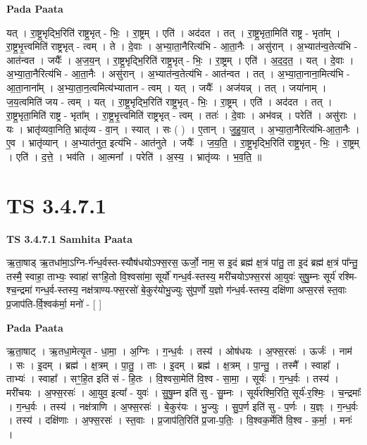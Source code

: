 \documentclass[17pt]{extarticle}
\begin{document}
\textbf{Pada Paata} \newline

यत् । रा॒ष्ट्र॒भृद्भि॒रिति॑ राष्ट्र॒भृत् - भिः॒ । रा॒ष्ट्रम् । एति॑ । अद॑दत । तत् । रा॒ष्ट्र॒भृता॒मिति॑ राष्ट्र - भृता᳚म् । रा॒ष्ट्र॒भृ॒त्त्वमिति॑ राष्ट्रभृत् - त्वम् । ते । दे॒वाः । अ॒भ्या॒ता॒नैरित्य॑भि - आ॒ता॒नैः । असु॑रान् । अ॒भ्यात॑न्व॒तेत्य॑भि - आत॑न्वत । जयैः᳚ । अ॒ज॒य॒न् । रा॒ष्ट्र॒भृद्भि॒रिति॑ राष्ट्र॒भृत् - भिः॒ । रा॒ष्ट्रम् । एति॑ । अ॒द॒द॒त॒ । यत् । दे॒वाः । अ॒भ्या॒ता॒नैरित्य॑भि - आ॒ता॒नैः । असु॑रान् । अ॒भ्यात॑न्व॒तेत्य॑भि - आत॑न्वत । तत् । अ॒भ्या॒ता॒नाना॒मित्य॑भि - आ॒ता॒नाना᳚म् । अ॒भ्या॒ता॒न॒त्वमित्य॑भ्यातान - त्वम् । यत् । जयैः᳚ । अज॑यन्न् । तत् । जया॑नाम् । ज॒य॒त्वमिति॑ जय - त्वम् । यत् । रा॒ष्ट्र॒भृद्भि॒रिति॑ राष्ट्र॒भृत् - भिः॒ । रा॒ष्ट्रम् । एति॑ । अद॑दत । तत् । रा॒ष्ट्र॒भृता॒मिति॑ राष्ट्र - भृता᳚म् । रा॒ष्ट्र॒भृ॒त्त्वमिति॑ राष्ट्रभृत् - त्वम् । ततः॑ । दे॒वाः । अभ॑वन्न् । परेति॑ । असु॑राः । यः । भ्रातृ॑व्यवा॒निति॒ भ्रातृ॑व्य - वा॒न् । स्यात् । सः ( ) । ए॒तान् । जु॒हु॒या॒त् । अ॒भ्या॒ता॒नैरित्य॑भि-आ॒ता॒नैः । ए॒व । भ्रातृ॑व्यान् । अ॒भ्यात॑नुत॒ इत्य॑भि - आत॑नुते । जयैः᳚ । ज॒य॒ति॒ । रा॒ष्ट्र॒भृद्भि॒रिति॑ राष्ट्र॒भृत् - भिः॒ । रा॒ष्ट्रम् । एति॑ । द॒त्ते॒ । भव॑ति । आ॒त्मना᳚ । परेति॑ । अ॒स्य॒ । भ्रातृ॑व्यः । भ॒व॒ति॒ ॥  \newline





\section{ TS 3.4.7.1 }

\textbf{TS 3.4.7.1 } \newline
\textbf{Samhita Paata} \newline

ऋ॒ता॒षाड् ऋ॒तधा॑मा॒ऽग्नि-र्ग॑न्ध॒र्वस्त-स्यौष॑धयोऽफ्स॒रस॒ ऊर्जो॒ नाम॒ स इ॒दं ब्रह्म॑ क्ष॒त्रं पा॑तु॒ ता इ॒दं ब्रह्म॑ क्ष॒त्रं पा᳚न्तु॒ तस्मै॒ स्वाहा॒ ताभ्यः॒ स्वाहा॑ सꣳहि॒तो वि॒श्वसा॑मा॒ सूर्यो॑ गन्ध॒र्व-स्तस्य॒ मरी॑चयोऽफ्स॒रस॑ आ॒युवः॑ सुषु॒म्नः सूर्य॑ रश्मि-श्च॒न्द्रमा॑ गन्ध॒र्व-स्तस्य॒ नक्ष॑त्राण्य-फ्स॒रसो॑ बे॒कुर॑योभु॒ज्युः सु॑प॒र्णो य॒ज्ञो ग॑न्ध॒र्व-स्तस्य॒ दक्षि॑णा अप्स॒रस॑ स्त॒वाः प्र॒जाप॑ति-र्वि॒श्वक॑र्मा॒ मनो॑ - [  ] \newline

\textbf{Pada Paata} \newline

ऋ॒ता॒षाट् । ऋ॒तधा॒मेत्यृ॒त - धा॒मा॒ । अ॒ग्निः । ग॒न्ध॒र्वः । तस्य॑ । ओष॑धयः । अ॒फ्स॒रसः॑ । ऊर्जः॑ । नाम॑ । सः । इ॒दम् । ब्रह्म॑ । क्ष॒त्रम् । पा॒तु॒ । ताः । इ॒दम् । ब्रह्म॑ । क्ष॒त्रम् । पा॒न्तु॒ । तस्मै᳚ । स्वाहा᳚ । ताभ्यः॑ । स्वाहा᳚ । सꣳ॒॒हि॒त इति॑ सं - हि॒तः । वि॒श्वसा॒मेति॑ वि॒श्व - सा॒मा॒ । सूर्यः॑ । ग॒न्ध॒र्वः । तस्य॑ । मरी॑चयः । अ॒फ्स॒रसः॑ । आ॒युव॒ इत्या᳚ - युवः॑ । सु॒षु॒म्न इति॑ सु - सु॒म्नः । सूर्य॑रश्मि॒रिति॒ सूर्य॑-र॒श्मिः॒ । च॒न्द्रमाः᳚ । ग॒न्ध॒र्वः । तस्य॑ । नक्ष॑त्राणि । अ॒फ्स॒रसः॑ । बे॒कुर॑यः । भु॒ज्युः । सु॒प॒र्ण इति॑ सु - प॒र्णः । य॒ज्ञ्ः । ग॒न्ध॒र्वः । तस्य॑ । दक्षि॑णाः । अ॒फ्स॒रसः॑ । स्त॒वाः । प्र॒जाप॑ति॒रिति॑ प्र॒जा-प॒तिः॒ । वि॒श्वक॒र्मेति॑ वि॒श्व - क॒र्मा॒ । मनः॑ ।  \newline
\end{document}
